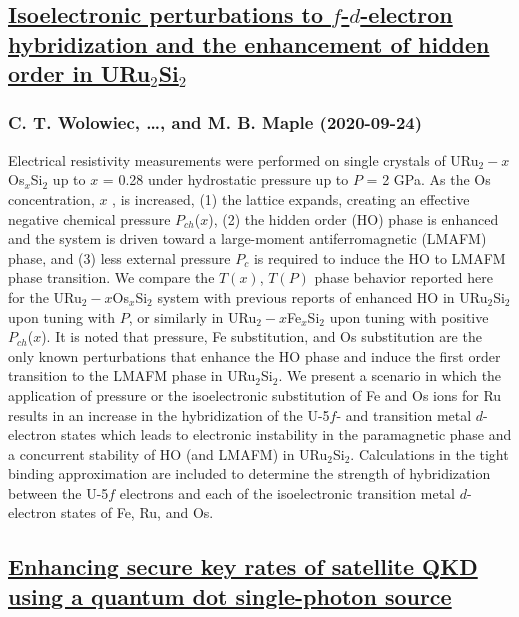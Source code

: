 \subsection*{\href{http://arxiv.org/abs/2009.11819v1}{Isoelectronic perturbations to $f$-$d$-electron hybridization and the  enhancement of hidden order in URu$_2$Si$_2$}}
\subsubsection*{C. T. Wolowiec, \dots, and M. B. Maple (2020-09-24)}
Electrical resistivity measurements were performed on single crystals of
URu$_2-x$Os$_x$Si$_2$ up to $x$ = 0.28 under hydrostatic pressure up to $P$ = 2
GPa. As the Os concentration, $x$ , is increased, (1) the lattice expands,
creating an effective negative chemical pressure $P_{ch}$($x$), (2) the hidden
order (HO) phase is enhanced and the system is driven toward a large-moment
antiferromagnetic (LMAFM) phase, and (3) less external pressure $P_{c}$ is
required to induce the HO to LMAFM phase transition. We compare the $T(x)$,
$T(P)$ phase behavior reported here for the URu$_2-x$Os$_x$Si$_2$ system with
previous reports of enhanced HO in URu$_2$Si$_2$ upon tuning with $P$, or
similarly in URu$_2-x$Fe$_x$Si$_2$ upon tuning with positive $P_{ch}$($x$). It
is noted that pressure, Fe substitution, and Os substitution are the only known
perturbations that enhance the HO phase and induce the first order transition
to the LMAFM phase in URu$_2$Si$_2$. We present a scenario in which the
application of pressure or the isoelectronic substitution of Fe and Os ions for
Ru results in an increase in the hybridization of the U-5$f$- and transition
metal $d$-electron states which leads to electronic instability in the
paramagnetic phase and a concurrent stability of HO (and LMAFM) in
URu$_2$Si$_2$. Calculations in the tight binding approximation are included to
determine the strength of hybridization between the U-5$f$ electrons and each
of the isoelectronic transition metal $d$-electron states of Fe, Ru, and Os.

\subsection*{\href{http://arxiv.org/abs/2009.11818v1}{Enhancing secure key rates of satellite QKD using a quantum dot  single-photon source}}
